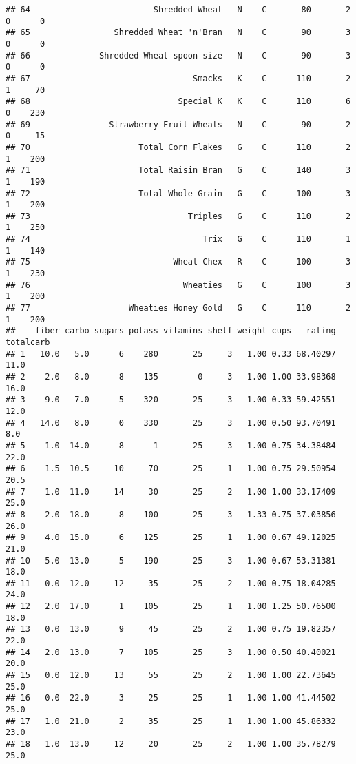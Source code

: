 \documentclass[
]{article}
\begin{document}
\begin{verbatim}
## 64                         Shredded Wheat   N    C       80       2   0      0
## 65                 Shredded Wheat 'n'Bran   N    C       90       3   0      0
## 66              Shredded Wheat spoon size   N    C       90       3   0      0
## 67                                 Smacks   K    C      110       2   1     70
## 68                              Special K   K    C      110       6   0    230
## 69                Strawberry Fruit Wheats   N    C       90       2   0     15
## 70                      Total Corn Flakes   G    C      110       2   1    200
## 71                      Total Raisin Bran   G    C      140       3   1    190
## 72                      Total Whole Grain   G    C      100       3   1    200
## 73                                Triples   G    C      110       2   1    250
## 74                                   Trix   G    C      110       1   1    140
## 75                             Wheat Chex   R    C      100       3   1    230
## 76                               Wheaties   G    C      100       3   1    200
## 77                    Wheaties Honey Gold   G    C      110       2   1    200
##    fiber carbo sugars potass vitamins shelf weight cups   rating totalcarb
## 1   10.0   5.0      6    280       25     3   1.00 0.33 68.40297      11.0
## 2    2.0   8.0      8    135        0     3   1.00 1.00 33.98368      16.0
## 3    9.0   7.0      5    320       25     3   1.00 0.33 59.42551      12.0
## 4   14.0   8.0      0    330       25     3   1.00 0.50 93.70491       8.0
## 5    1.0  14.0      8     -1       25     3   1.00 0.75 34.38484      22.0
## 6    1.5  10.5     10     70       25     1   1.00 0.75 29.50954      20.5
## 7    1.0  11.0     14     30       25     2   1.00 1.00 33.17409      25.0
## 8    2.0  18.0      8    100       25     3   1.33 0.75 37.03856      26.0
## 9    4.0  15.0      6    125       25     1   1.00 0.67 49.12025      21.0
## 10   5.0  13.0      5    190       25     3   1.00 0.67 53.31381      18.0
## 11   0.0  12.0     12     35       25     2   1.00 0.75 18.04285      24.0
## 12   2.0  17.0      1    105       25     1   1.00 1.25 50.76500      18.0
## 13   0.0  13.0      9     45       25     2   1.00 0.75 19.82357      22.0
## 14   2.0  13.0      7    105       25     3   1.00 0.50 40.40021      20.0
## 15   0.0  12.0     13     55       25     2   1.00 1.00 22.73645      25.0
## 16   0.0  22.0      3     25       25     1   1.00 1.00 41.44502      25.0
## 17   1.0  21.0      2     35       25     1   1.00 1.00 45.86332      23.0
## 18   1.0  13.0     12     20       25     2   1.00 1.00 35.78279      25.0

\end{verbatim}
\end{document}
